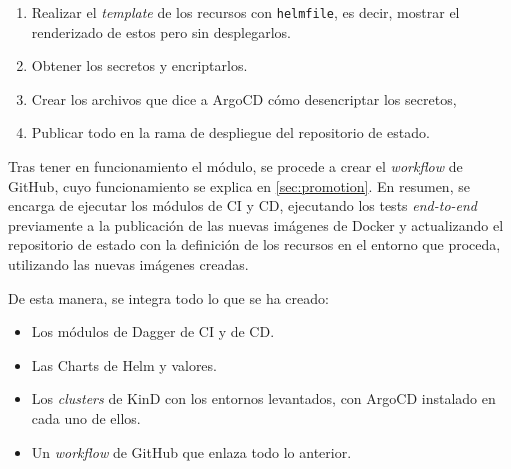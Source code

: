 \begin{enumerate}
  \item Realizar el \textit{template} de los recursos con \texttt{helmfile}, es decir, mostrar el renderizado de estos pero sin desplegarlos.
  \item Obtener los secretos y encriptarlos.
  \item Crear los archivos que dice a ArgoCD cómo desencriptar los secretos,
  \item Publicar todo en la rama de despliegue del repositorio de estado.
\end{enumerate}

Tras tener en funcionamiento el módulo, se procede a crear el \textit{workflow} de GitHub, cuyo funcionamiento se explica en \ref{sec:promotion}. En resumen, se encarga de ejecutar los módulos de CI y CD, ejecutando los tests \textit{end-to-end} previamente a la publicación de las nuevas imágenes de Docker y actualizando el repositorio de estado con la definición de los recursos en el entorno que proceda, utilizando las nuevas imágenes creadas.

De esta manera, se integra todo lo que se ha creado:

\begin{itemize}
  \item Los módulos de Dagger de CI y de CD.
  \item Las Charts de Helm y valores.
  \item Los \textit{clusters} de KinD con los entornos levantados, con ArgoCD instalado en cada uno de ellos.
  \item Un \textit{workflow} de GitHub que enlaza todo lo anterior.
\end{itemize}
